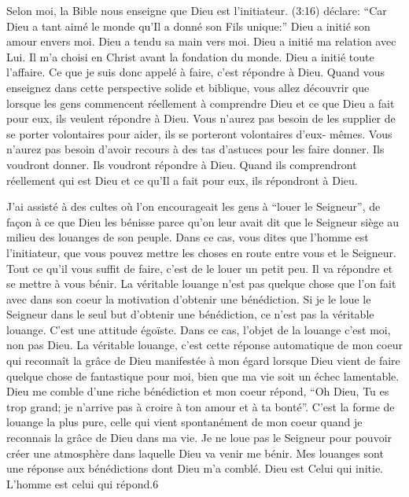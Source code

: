 Selon moi, la Bible nous enseigne que Dieu est l’initiateur. (3:16) déclare: “Car Dieu a tant aimé le monde qu’Il a
donné son Fils unique:” Dieu a initié son amour envers moi. Dieu a tendu sa main vers moi. Dieu a initié ma relation
avec Lui. Il m’a choisi en Christ avant la fondation du monde. Dieu a initié toute l’affaire. Ce que je suis donc appelé
à faire, c’est répondre à Dieu. Quand vous enseignez dans cette perspective solide et biblique, vous allez découvrir
que lorsque les gens commencent réellement à comprendre Dieu et ce que Dieu a fait pour eux, ils veulent répondre
à Dieu. Vous n’aurez pas besoin de les supplier de se porter volontaires pour aider, ils se porteront volontaires d’eux-
mêmes. Vous n’aurez pas besoin d’avoir recours à des tas d'astuces pour les faire donner. Ils voudront donner. Ils
voudront répondre à Dieu. Quand ils comprendront réellement qui est Dieu et ce qu’Il a fait pour eux, ils répondront à
Dieu.

J’ai assisté à des cultes où l'on encourageait les gens à “louer le Seigneur”, de façon à ce que Dieu les bénisse parce
qu’on leur avait dit que le Seigneur siège au milieu des louanges de son peuple. Dans ce cas, vous dites que l’homme
est l’initiateur, que vous pouvez mettre les choses en route entre vous et le Seigneur. Tout ce qu'il vous suffit de faire,
c’est de le louer un petit peu. Il va répondre et se mettre à vous bénir. La véritable louange n’est pas quelque chose
que l’on fait avec dans son coeur la motivation d’obtenir une bénédiction. Si je le loue le Seigneur dans le seul but
d’obtenir une bénédiction, ce n’est pas la véritable louange. C’est une attitude égoïste. Dans ce cas, l’objet de la
louange c’est moi, non pas Dieu. La véritable louange, c’est cette réponse automatique de mon coeur qui reconnaît la
grâce de Dieu manifestée à mon égard lorsque Dieu vient de faire quelque chose de fantastique pour moi, bien que
ma vie soit un échec lamentable. Dieu me comble d'une riche bénédiction et mon coeur répond, “Oh Dieu, Tu es trop
grand; je n’arrive pas à croire à ton amour et à ta bonté”. C’est la forme de louange la plus pure, celle qui vient
spontanément de mon coeur quand je reconnais la grâce de Dieu dans ma vie. Je ne loue pas le Seigneur pour
pouvoir créer une atmosphère dans laquelle Dieu va venir me bénir. Mes louanges sont une réponse aux bénédictions
dont Dieu m’a comblé. Dieu est Celui qui initie. L’homme est celui qui répond.6

